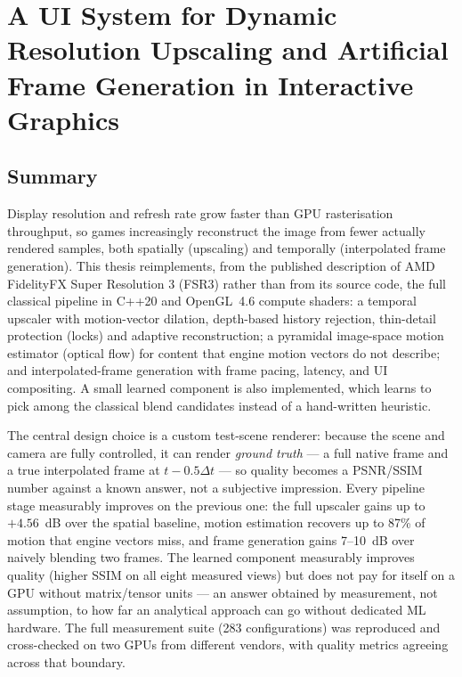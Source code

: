 \documentclass{mathos}
\begin{document}
\chapter*{A UI System for Dynamic Resolution Upscaling and Artificial Frame Generation in Interactive Graphics}

\section*{Summary}

Display resolution and refresh rate grow faster than GPU rasterisation
throughput, so games increasingly reconstruct the image from fewer actually
rendered samples, both spatially (upscaling) and temporally (interpolated
frame generation). This thesis reimplements, from the published description
of AMD FidelityFX Super Resolution 3 (FSR3) rather than from its source
code, the full classical pipeline in C++20 and OpenGL~4.6 compute shaders:
a temporal upscaler with motion-vector dilation, depth-based history
rejection, thin-detail protection (locks) and adaptive reconstruction; a
pyramidal image-space motion estimator (optical flow) for content that
engine motion vectors do not describe; and interpolated-frame generation
with frame pacing, latency, and UI compositing. A small learned component
is also implemented, which learns to pick among the classical blend
candidates instead of a hand-written heuristic.

The central design choice is a custom test-scene renderer: because the
scene and camera are fully controlled, it can render \emph{ground truth} —
a full native frame and a true interpolated frame at $t-0.5\Delta t$ — so
quality becomes a PSNR/SSIM number against a known answer, not a subjective
impression. Every pipeline stage measurably improves on the previous one:
the full upscaler gains up to $+4.56$~dB over the spatial baseline, motion
estimation recovers up to 87\% of motion that engine vectors miss, and
frame generation gains 7--10~dB over naively blending two frames. The
learned component measurably improves quality (higher SSIM on all eight
measured views) but does not pay for itself on a GPU without matrix/tensor
units — an answer obtained by measurement, not assumption, to how far an
analytical approach can go without dedicated ML hardware. The full
measurement suite (283 configurations) was reproduced and cross-checked on
two GPUs from different vendors, with quality metrics agreeing across that
boundary.
\end{document}
